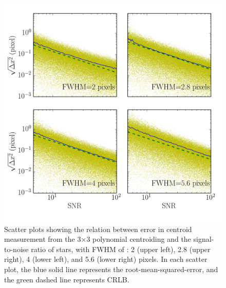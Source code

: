 \documentclass[12pt, preprint]{aastex}
\begin{document}
\begin{figure}[!htb]
  \includegraphics[width=\linewidth]{snr_psfpix28poly.png}
\endminipage
\caption{Scatter plots showing the relation between error in centroid measurement from the 3$\times$3 polynomial centroiding and the signal-to-noise ratio of stars, with FWHM of : 2 (upper left), 2.8 (upper right), 4 (lower left), and 5.6 (lower right) pixels. In each scatter plot, the blue solid line represents the root-mean-squared-error, and the green dashed line represents CRLB.}\label{3}
\end{figure}
\end{document}
